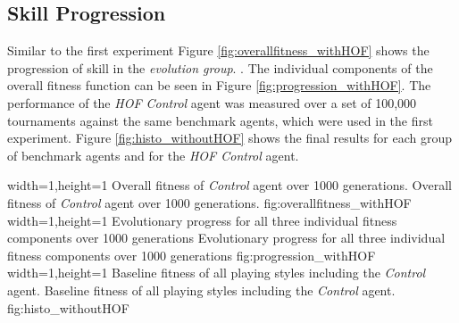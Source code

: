 \subsection{Skill Progression}
Similar to the first experiment Figure \ref{fig:overallfitness_withHOF} shows the progression of skill in the \textit{evolution group}. . The individual components of the overall fitness function can be seen in Figure \ref{fig:progression_withHOF}. The performance of the \textit{HOF Control} agent was measured over a set of 100,000 tournaments against the same benchmark agents, which were used in the first experiment. Figure \ref{fig:histo_withoutHOF} shows the final results for each group of benchmark agents and for the \textit{HOF Control} agent.\par
{}%
  {width=1\textwidth,height=1\textheight}%
  {Overall fitness of \textit{Control} agent over 1000 generations.}%
  {Overall fitness of \textit{Control} agent over 1000 generations.}%
  {fig:overallfitness_withHOF}%
  {width=1\textwidth,height=1\textheight}%
  {Evolutionary progress for all three individual fitness components over 1000 generations}%
  {Evolutionary progress for all three individual fitness components over 1000 generations}%
  {fig:progression_withHOF}%
  {width=1\textwidth,height=1\textheight}%
  {Baseline fitness of all playing styles including the \textit{Control} agent.}%
  {Baseline fitness of all playing styles including the \textit{Control} agent.}%
  {fig:histo_withoutHOF}%
